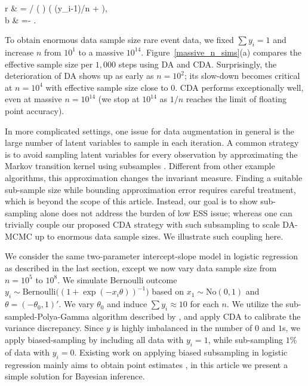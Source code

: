 \documentclass[11pt]{article}
\newcommand{\be}{\begin{equs}}
\newcommand{\ee}{\end{equs}}
\newcommand{\No}{\text{No}}
\newcommand{\Bern}{\text{Bernoulli}}
\begin{document}
\be
 r & = / \left (    \tanh{} \right) \vee \big ( (\sum y_i-1)/n + \epsilon \big), \\
b & = - \theta.
\ee

{To obtain enormous data sample size rare event data}, we fixed $\sum
y_i=1$ and increase $n$ from $10^1$ to a massive $10^{14}$. 
Figure~\ref{massive_n_sims}(a) compares the effective sample size per $1,000$
steps using DA and CDA. Surprisingly, the deterioration of DA shows up as early
as $n=10^2$; its slow-down becomes critical at $n=10^4$ with
effective sample size close to $0$. CDA performs exceptionally well, even
at massive $n=10^{14}$ (we stop at $10^{14}$ as $1/n$ reaches the limit of floating
point accuracy).

In more complicated settings, one issue for data augmentation in general is the large number of latent variables to sample in each iteration.  A common strategy is to {avoid sampling latent variables for
every observation by approximating the Markov transition kernel using subsamples} 
\citep{quiroz2016exact,johndrow2015approximations}. {Different from other
example algorithms, this approximation changes the invariant measure. Finding
a suitable sub-sample size while bounding approximation
error requires careful treatment, which is beyond the scope of
this article. Instead, our goal is to show sub-sampling alone does not address the burden of low ESS issue; whereas }{one can trivially couple our proposed CDA
strategy with such subsampling to scale DA-MCMC up to enormous data sample sizes.  We illustrate such 
coupling here.}

We consider the same two-parameter intercept-slope model in logistic regression
as described in the last section, except we now vary data sample size from  $n=10^5$ to $10^8$. We simulate Bernoulli outcome $y_i\sim \Bern\big(({1+\exp(-x_i\theta)})^{-1}\big)$ based on $x_1\sim \No(0,1)$ and $\theta=(-\theta_0,1)'$. We vary $\theta_0$ and induce $\sum{y_i}\approx
10$ for each $n$. We utilize the sub-sampled-Polya-Gamma algorithm described by \cite{johndrow2015approximations},
and apply CDA to calibrate the variance discrepancy. Since $y$ is highly imbalanced in
the number of $0$ and $1$s, we apply biased-sampling by including all data
with $y_i=1$, while sub-sampling $1\%$ of data with $y_i=0$. {Existing work on applying biased subsampling in logistic regression mainly aims to obtain point estimates \citep{king2001logistic,wang2017optimal},
in this article we present a simple solution for Bayesian inference.}
\end{document}
